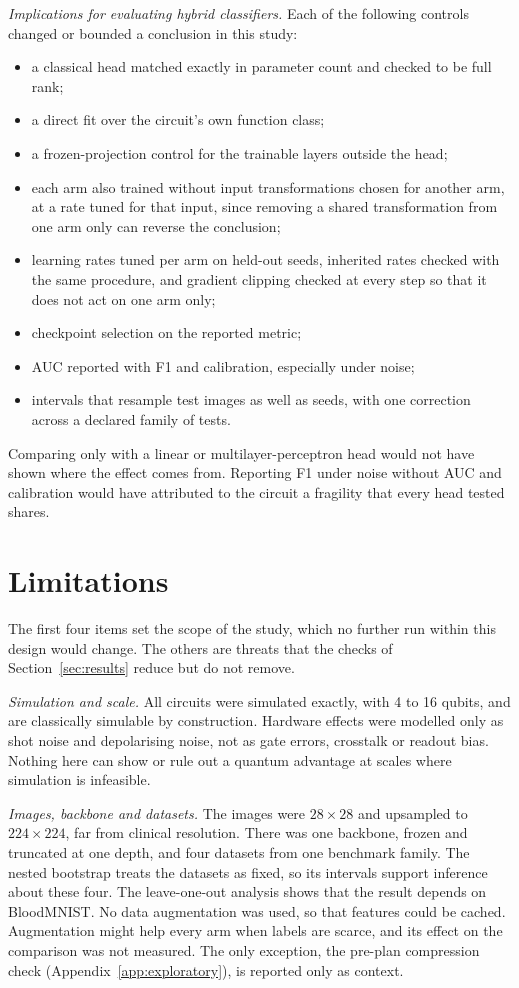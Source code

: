\documentclass{ieeeaccess}
\begin{document}
\emph{Implications for evaluating hybrid classifiers.} Each of the following controls changed or bounded a conclusion in this study:
\begin{itemize}
\item a classical head matched exactly in parameter count and checked to be full rank;
\item a direct fit over the circuit's own function class;
\item a frozen-projection control for the trainable layers outside the head;
\item each arm also trained without input transformations chosen for another arm, at a rate tuned for that input, since removing a shared transformation from one arm only can reverse the conclusion;
\item learning rates tuned per arm on held-out seeds, inherited rates checked with the same procedure, and gradient clipping checked at every step so that it does not act on one arm only;
\item checkpoint selection on the reported metric;
\item AUC reported with F1 and calibration, especially under noise;
\item intervals that resample test images as well as seeds, with one correction across a declared family of tests.
\end{itemize}
Comparing only with a linear or multilayer-perceptron head would not have shown where the effect comes from. Reporting F1 under noise without AUC and calibration would have attributed to the circuit a fragility that every head tested shares.

\section{Limitations}
\label{sec:limitations}
The first four items set the scope of the study, which no further run within this design would change. The others are threats that the checks of Section~\ref{sec:results} reduce but do not remove.

\emph{Simulation and scale.} All circuits were simulated exactly, with 4 to 16 qubits, and are classically simulable by construction. Hardware effects were modelled only as shot noise and depolarising noise, not as gate errors, crosstalk or readout bias. Nothing here can show or rule out a quantum advantage at scales where simulation is infeasible.

\emph{Images, backbone and datasets.} The images were $28\times28$ and upsampled to $224\times224$, far from clinical resolution. There was one backbone, frozen and truncated at one depth, and four datasets from one benchmark family. The nested bootstrap treats the datasets as fixed, so its intervals support inference about these four. The leave-one-out analysis shows that the result depends on BloodMNIST. No data augmentation was used, so that features could be cached. Augmentation might help every arm when labels are scarce, and its effect on the comparison was not measured. The only exception, the pre-plan compression check (Appendix~\ref{app:exploratory}), is reported only as context.
\end{document}
